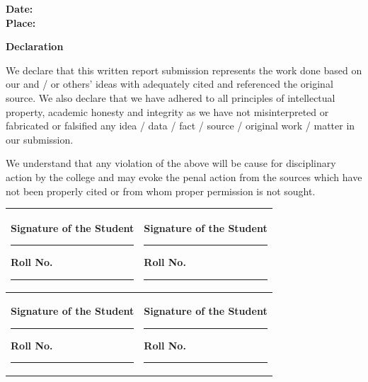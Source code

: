 \noindent\textbf{Date:}\\
\noindent\textbf{Place:} \PlaceCity

\clearpage

\begin{center}
    {\Large\bfseries\color{Eclipse} \University\par}
    \vspace{4pt}
    {\Large\bfseries \College\par}
    \vspace{30pt}
    {\Huge\bfseries\color{Cardinal} Declaration\par}
\end{center}

\vspace{12pt}

We declare that this written report submission represents the work done based
on our and / or others' ideas with adequately cited and referenced the
original source. We also declare that we have adhered to all principles of
intellectual property, academic honesty and integrity as we have not
misinterpreted or fabricated or falsified any idea / data / fact / source /
original work / matter in our submission.

\vspace{6pt}

We understand that any violation of the above will be cause for disciplinary
action by the college and may evoke the penal action from the sources which
have not been properly cited or from whom proper permission is not sought.

\vspace{30pt}

\renewcommand{\arraystretch}{2.4}
\begin{tabular}{|p{}|p{}|}
    \hline
    \textbf{Signature of the Student} \newline\rule{6cm}{0.4pt}\newline
    \textbf{Roll No.} \rule{4cm}{0.4pt} &
    \textbf{Signature of the Student} \newline\rule{6cm}{0.4pt}\newline
    \textbf{Roll No.} \rule{4cm}{0.4pt} \\ \hline
    \textbf{Signature of the Student} \newline\rule{6cm}{0.4pt}\newline
    \textbf{Roll No.} \rule{4cm}{0.4pt} &
    \textbf{Signature of the Student} \newline\rule{6cm}{0.4pt}\newline
    \textbf{Roll No.} \rule{4cm}{0.4pt} \\ \hline
\end{tabular}
\renewcommand{\arraystretch}{1.0}

